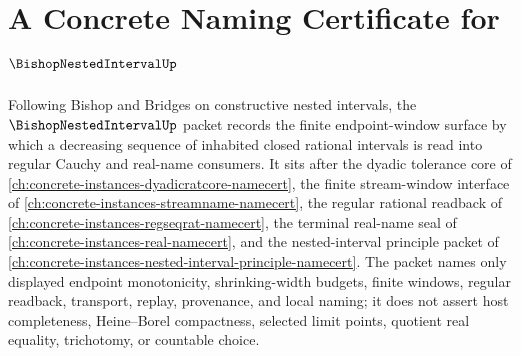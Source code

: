 \chapter{A Concrete Naming Certificate for $\BishopNestedIntervalUp$}
\label{ch:concrete-instances-bishop-nested-interval-namecert}

Following Bishop and Bridges on constructive nested intervals, the $\BishopNestedIntervalUp$ packet records the finite endpoint-window surface by which a decreasing sequence of inhabited closed rational intervals is read into regular Cauchy and real-name consumers. It sits after the dyadic tolerance core of \autoref{ch:concrete-instances-dyadicratcore-namecert}, the finite stream-window interface of \autoref{ch:concrete-instances-streamname-namecert}, the regular rational readback of \autoref{ch:concrete-instances-regseqrat-namecert}, the terminal real-name seal of \autoref{ch:concrete-instances-real-namecert}, and the nested-interval principle packet of \autoref{ch:concrete-instances-nested-interval-principle-namecert}. The packet names only displayed endpoint monotonicity, shrinking-width budgets, finite windows, regular readback, transport, replay, provenance, and local naming; it does not assert host completeness, Heine--Borel compactness, selected limit points, quotient real equality, trichotomy, or countable choice.

